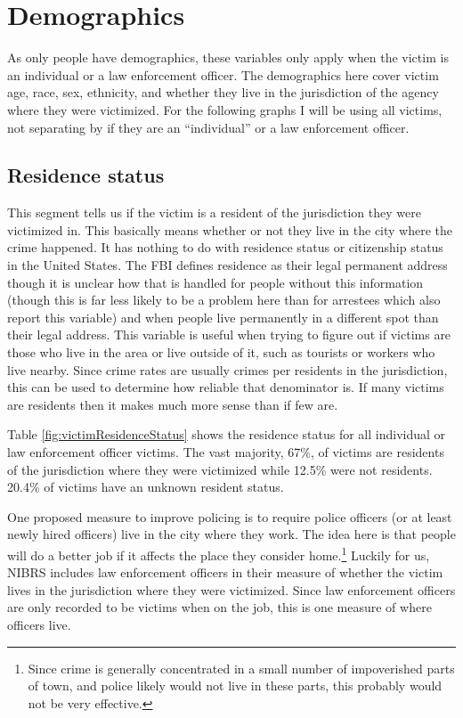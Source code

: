 \documentclass[
]{krantz}
\begin{document}
\section{Demographics}\label{demographics-2}

As only people have demographics, these variables only apply
when the victim is an individual or a law enforcement
officer. The demographics here cover victim age, race, sex,
ethnicity, and whether they live in the jurisdiction of the
agency where they were victimized. For the following graphs
I will be using all victims, not separating by if they are
an ``individual'' or a law enforcement officer.

\subsection{Residence status}\label{residence-status}

This segment tells us if the victim is a resident of the
jurisdiction they were victimized in. This basically means
whether or not they live in the city where the crime
happened. It has nothing to do with residence status or
citizenship status in the United States. The FBI defines
residence as their legal permanent address though it is
unclear how that is handled for people without this
information (though this is far less likely to be a problem
here than for arrestees which also report this variable) and
when people live permanently in a different spot than their
legal address. This variable is useful when trying to figure
out if victims are those who live in the area or live
outside of it, such as tourists or workers who live nearby.
Since crime rates are usually crimes per residents in the
jurisdiction, this can be used to determine how reliable
that denominator is. If many victims are residents then it
makes much more sense than if few are.

Table \ref{fig:victimResidenceStatus} shows the residence
status for all individual or law enforcement officer
victims. The vast majority, 67\%, of victims are residents
of the jurisdiction where they were victimized while 12.5\%
were not residents. 20.4\% of victims have an unknown
resident status.

One proposed measure to improve policing is to require
police officers (or at least newly hired officers) live in
the city where they work. The idea here is that people will
do a better job if it affects the place they consider
home.\footnote{Since crime is generally concentrated in a
  small number of impoverished parts of town, and police
  likely would not live in these parts, this probably would
  not be very effective.} Luckily for us, NIBRS includes law
enforcement officers in their measure of whether the victim
lives in the jurisdiction where they were victimized. Since
law enforcement officers are only recorded to be victims
when on the job, this is one measure of where officers live.
\end{document}

